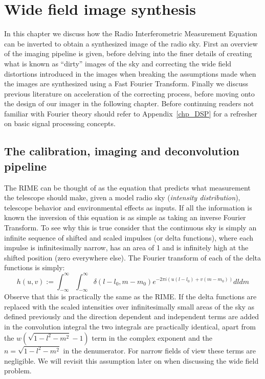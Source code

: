 \chapter{Wide field image synthesis}
In this chapter we discuss how the Radio Interferometric Measurement Equation can be inverted to obtain a synthesized image of the radio sky. First an overview of the imaging pipeline is given, before
delving into the finer details of creating what is known as ``dirty'' images of the sky and correcting the wide field distortions introduced in the images when breaking the assumptions made when the images 
are synthesized using a Fast Fourier Transform. Finally we discuss previous literature on acceleration of the correcting process, before moving onto the design of our imager in the following chapter. Before
continuing readers not familiar with Fourier theory should refer to Appendix~\ref{chp_DSP} for a refresher on basic signal processing concepts.
\section{The calibration, imaging and deconvolution pipeline}
The RIME can be thought of as the equation that predicts what measurement the telescope should make, given a model radio sky (\emph{intensity distribution}), telescope behavior and environmental effects as inputs. 
If all the information is known the inversion of this equation is as simple as taking an inverse Fourier Transform. To see why this is true consider that the continuous sky is simply an infinite sequence of 
shifted and scaled impulses (or delta functions), where each impulse is infinitesimally narrow, has an area of 1 and is infinitely high at the shifted position (zero everywhere else). The Fourier transform 
of each of the delta functions is simply:
\begin{equation}
 \label{eqn_delta_response}
 h(u,v) := \int_{-\infty}^\infty\int_{-\infty}^\infty \delta(l-l_0,m-m_0)e^{-2\pi i(u(l-l_0)+v(m-m_0))}dldm
\end{equation}
Observe that this is practically the same as the RIME. If the delta functions are replaced with the scaled intensities over infinitesimally small areas of the sky as defined previously and the direction dependent and
independent terms are added in the convolution integral the two integrals are practically identical, apart from the $w(\sqrt{1-l^2-m^2}-1)$ term in the complex exponent and the $n = \sqrt{1-l^2-m^2}$ in the denumerator. 
For narrow fields of view these terms are negligible. We will revisit this assumption later on when discussing the wide field problem.

